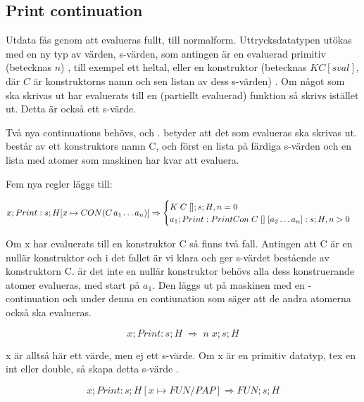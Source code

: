 \documentclass[../Appendix]{subfiles}
\begin{document}
\subsection{Print continuation}
\label{sec:printcont}
Utdata fås genom att  evalueras fullt, till normalform. 
Uttrycksdatatypen utökas med en ny typ av värden, 
s-värden, som antingen är en evaluerad primitiv (betecknas $n$)
, till exempel ett heltal, eller en konstruktor (betecknas $K C [sval]$, där
$C$ är konstruktorns namn och sen listan av dess s-värden) .
Om något som ska skrivas ut har evaluerats till en (partiellt evaluerad)
funktion så skrivs  istället ut. Detta är också ett s-värde.





Två nya continuations behövs,  och .
 betyder att det som evalueras ska skrivas ut.  består av ett
konstruktors namn C, och först en lista på färdiga s-värden och en lista med
atomer som maskinen har kvar att evaluera.

Fem nya regler läggs till:

\[
x ; Print : s ; H[x \mapsto CON(C\,a_1 \ldots a_n)]
\Rightarrow \begin{cases} 
K \; C \; [] ; s ; H , n = 0 \\
a_1 ; Print : PrintCon \; C \; [] \; [a_2 \ldots a_n] : s ; H , n > 0
\end{cases}
\]

Om x har evaluerats till en konstruktor C så finns två fall. Antingen att C är
en nullär konstruktor och i det fallet är vi klara och ger s-värdet bestående
av konstruktorn C.
    är det inte en nullär konstruktor behövs alla dess konstruerande atomer
evalueras, med start på $a_1$. Den läggs ut på maskinen med en -continuation
och under denna en contiunation som säger att de andra atomerna också ska
evalueras.
 

\[
x ; Print : s ; H \; \Rightarrow \; n \; x ; s ; H
\]

x är alltså här ett värde, men ej ett s-värde.
Om x är en primitiv datatyp, tex en int eller double, så skapa detta s-värde
.


\[
x ; Print : s ; H[x \mapsto FUN / PAP] \Rightarrow FUN ; s ; H
\]
\end{document}
